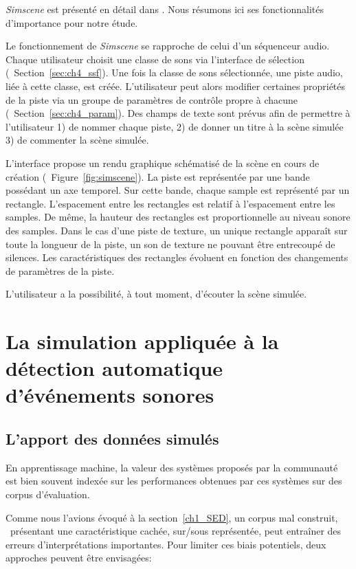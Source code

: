 \emph{Simscene} est présenté en détail dans \citep{rossignol2015simscene}. Nous résumons ici ses fonctionnalités d'importance pour notre étude. 

Le fonctionnement de \emph{Simscene} se rapproche de celui d'un séquenceur audio. Chaque utilisateur choisit une classe de sons via l'interface de sélection (\cf~Section~\ref{sec:ch4_ssf}). Une fois la classe de sons sélectionnée, une piste audio, liée à cette classe, est créée. L'utilisateur peut alors modifier certaines propriétés de la piste via un groupe de paramètres de contrôle propre à chacune (\cf~Section~\ref{sec:ch4_param}). Des champs de texte sont prévus afin de permettre à l'utilisateur 1) de nommer chaque piste, 2) de donner un titre à la scène simulée 3) de commenter la scène simulée.

L'interface propose un rendu graphique schématisé de la scène en cours de création (\cf~Figure~\ref{fig:simscene}). La piste est représentée par une bande possédant un axe temporel. Sur cette bande, chaque sample est représenté par un rectangle. L'espacement entre les rectangles est relatif à l'espacement entre les samples. De même, la hauteur des rectangles est proportionnelle au niveau sonore des samples. Dans le cas d'une piste de texture, un unique rectangle apparaît sur toute la longueur de la piste, un son de texture ne pouvant être entrecoupé de silences. Les caractéristiques des rectangles évoluent en fonction des changements de paramètres de la piste.

L'utilisateur a la possibilité, à tout moment, d'écouter la scène simulée.

\section{La simulation appliquée à la détection automatique d'événements sonores}
\label{sec:ch4_modAnaAuto}

\subsection{L'apport des données simulés}

En apprentissage machine, la valeur des systèmes proposés par la communauté est bien souvent indexée sur les performances obtenues par ces systèmes sur des corpus d'évaluation.

Comme nous l'avions évoqué à la section~\ref{ch1_SED}, un corpus mal construit, \ie~présentant une caractéristique cachée, sur/sous représentée, peut entraîner des erreurs d'interprétations importantes. Pour limiter ces biais potentiels, deux approches peuvent être envisagées:

